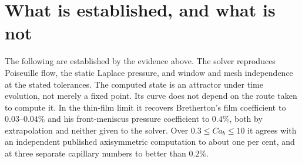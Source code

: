 \documentclass[11pt,a4paper]{article}
\begin{document}
\section{What is established, and what is not}
\label{sec:open}

The following are established by the evidence above. The solver reproduces
Poiseuille flow, the static Laplace pressure, and window and mesh independence
at the stated tolerances. The computed state is an attractor under time
evolution, not merely a fixed point. Its curve does not depend on the route
taken to compute it. In the thin-film limit it recovers Bretherton's film
coefficient to $0.03$--$0.04\%$ and his front-meniscus pressure coefficient to
$0.4\%$, both by extrapolation and neither given to the solver. Over $0.3\le Ca_b\le10$ it
agrees with an independent published axisymmetric computation to about one per
cent, and at three separate capillary numbers to better than $0.2\%$.
\end{document}
